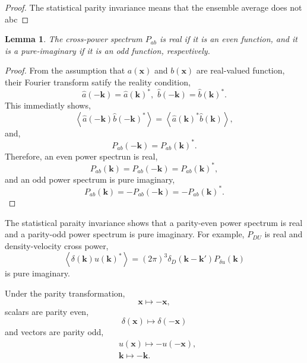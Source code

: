\documentclass[a4paper,11pt, fleqn]{article}
\newtheorem{lemma}{Lemma}
\begin{document}
\begin{proof}
  The statistical parity invariance means that the ensemble average does not
  abc
\end{proof}

\vspace{5mm}
\begin{lemma}
  The cross-power spectrum $P_{ab}$ is real if it is an even function,
  and it is a pure-imaginary if it is an odd function, respevtively.
\end{lemma}

\begin{proof}
  From the assumption that $a(\bm{x})$ and $b(\bm{x})$ are real-valued
  function, their Fourier transform satify the reality condition,
  \begin{equation}
    \hat{a}(-\bm{k}) = \hat{a}(\bm{k})^*, \,\,
    \hat{b}(-\bm{k}) = \hat{b}(\bm{k})^*.
  \end{equation}
  This immediatly shows,
  \begin{equation}
    \left\langle \hat{a}(-\bm{k}) \hat{b}(-\bm{k})^* \right\rangle
    = \left\langle \hat{a}(\bm{k})^* \hat{b}(\bm{k}) \right\rangle,
  \end{equation}
  and,
  \begin{equation}
    P_{ab}(-\bm{k}) = P_{ab}(\bm{k})^*.
  \end{equation}
  Therefore, an even power spectrun is real,
  \begin{equation}
    P_{ab}(\bm{k}) = P_{ab}(-\bm{k}) = P_{ab}(\bm{k})^*,
  \end{equation}
  and an odd power spectrum is pure imaginary,
  \begin{equation}
    P_{ab}(\bm{k}) = -P_{ab}(-\bm{k}) = -P_{ab}(\bm{k})^*.
  \end{equation}
\end{proof}


The statistical paraity invariance shows that a parity-even power
spectrum is real and a parity-odd power spectrum is pure
imaginary. For example, $P_{DU}$ is real and density-velocity cross power,
%
\begin{equation}
  \left\langle \delta(\bm{k}) u(\bm{k})^* \right\rangle
  = (2\pi)^3 \delta_D(\bm{k} - \bm{k}') P_{\delta u}(\bm{k})
\end{equation}
%
is pure imaginary.

Under the parity transformation,
%
\begin{equation}
  \bm{x} \mapsto -\bm{x},
\end{equation}
scalars are parity even,
%
\begin{equation}
  \delta(\bm{x}) \mapsto \delta(-\bm{x})
\end{equation}
%
and vectors are parity odd,
%
\begin{align}
  &u(\bm{x}) \mapsto -u(-\bm{x}),\\
  &\bm{k} \mapsto - \bm{k}.
\end{align}
%
\end{document}
